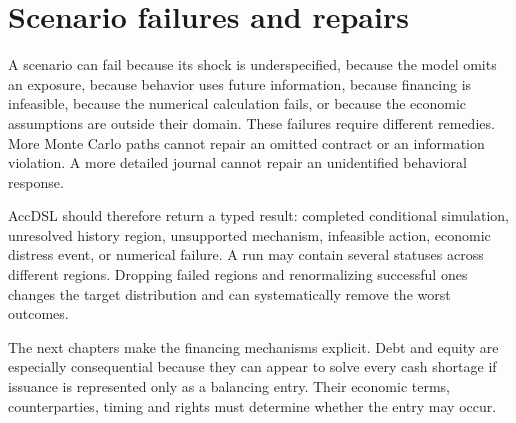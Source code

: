 \section{Scenario failures and repairs}
A scenario can fail because its shock is underspecified, because the model omits an exposure, because behavior uses future information, because financing is infeasible, because the numerical calculation fails, or because the economic assumptions are outside their domain. These failures require different remedies. More Monte Carlo paths cannot repair an omitted contract or an information violation. A more detailed journal cannot repair an unidentified behavioral response.

AccDSL should therefore return a typed result: completed conditional simulation, unresolved history region, unsupported mechanism, infeasible action, economic distress event, or numerical failure. A run may contain several statuses across different regions. Dropping failed regions and renormalizing successful ones changes the target distribution and can systematically remove the worst outcomes.

The next chapters make the financing mechanisms explicit. Debt and equity are especially consequential because they can appear to solve every cash shortage if issuance is represented only as a balancing entry. Their economic terms, counterparties, timing and rights must determine whether the entry may occur.
